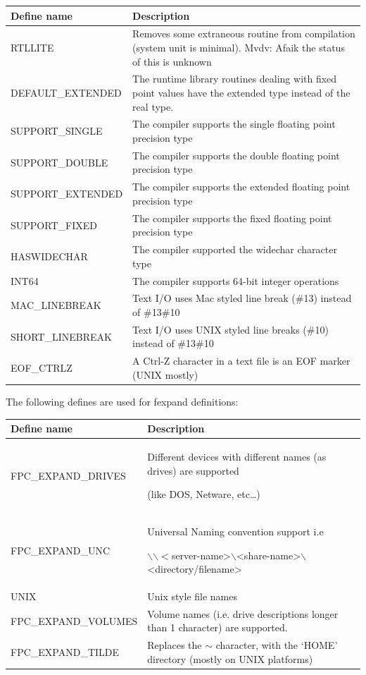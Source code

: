 \documentclass [a4paper,12pt]{article}
\begin{document}
\begin{longtable}{|l|p{10cm}|}
\hline
Define name & Description \\
\hline
\endhead
\hline
\endfoot
RTLLITE&
    Removes some extraneous routine from compilation (system unit
    is minimal). Mvdv: Afaik the status of this is unknown \\
DEFAULT{\_}EXTENDED&

    The runtime library routines dealing with fixed point values have the
    \textsf{extended} type instead of the \textsf{real} type. \\
SUPPORT{\_}SINGLE&
    The compiler supports the \textsf{single} floating point precision type \\
SUPPORT{\_}DOUBLE&
    The compiler supports the \textsf{double }floating point precision type \\
SUPPORT{\_}EXTENDED&
    The compiler supports the \textsf{extended }floating point
    precision type \\
SUPPORT{\_}FIXED&
    The compiler supports the \textsf{fixed} floating point precision type \\
HASWIDECHAR&
    The compiler supported the \textsf{widechar} character type \\
INT64&
    The compiler supports 64-bit integer operations \\
MAC{\_}LINEBREAK&
    Text I/O uses Mac styled line break ({\#}13) instead of {\#}13{\#}10 \\
SHORT{\_}LINEBREAK&
    Text I/O uses UNIX styled line breaks ({\#}10) instead of {\#}13{\#}10 \\
EOF{\_}CTRLZ&
    A Ctrl-Z character in a text file is an EOF marker (UNIX mostly) \\
\end{longtable}

The following defines are used for fexpand definitions:

\begin{longtable}{|l|p{10cm}|}
\hline
Define name & Description \\
\hline
\endhead
\hline
\endfoot
FPC{\_}EXPAND{\_}DRIVES&
    Different devices with different names (as drives) are
    supported \par (like DOS, Netware, etc\ldots ) \\
FPC{\_}EXPAND{\_}UNC&
    Universal Naming convention support i.e \par $\backslash \backslash
    < $server-name>$\backslash $<share-name>$\backslash $<directory/filename> \\
UNIX&
    Unix style file names \\
FPC{\_}EXPAND{\_}VOLUMES&
    Volume names (i.e. drive descriptions longer than 1
    character) are supported. \\
FPC{\_}EXPAND{\_}TILDE&
    Replaces the $\sim $ character, with the `HOME' directory
    (mostly on UNIX platforms) \\
\end{longtable}
\end{document}
